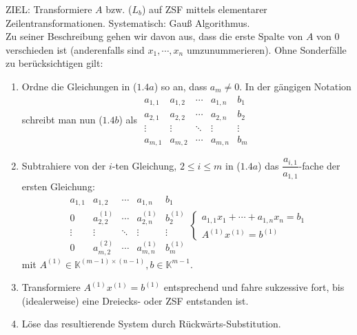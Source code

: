ZIEL: Transformiere $A$ bzw. (\hyperref[Lb]{$L_b$}) auf ZSF mittels elementarer Zeilentransformationen.  Systematisch: Gauß Algorithmus.\\
Zu seiner Beschreibung gehen wir davon aus, dass die erste Spalte von $A$ von $0$ verschieden ist (anderenfalls sind $x_1,\cdots ,x_n$ umzunummerieren).  Ohne Sonderfälle zu berücksichtigen gilt:
\begin{enumerate}
\item Ordne die Gleichungen in ($1.4a$) so an, dass $a_m\not= 0$.  In der gängigen Notation schreibt man nun (\hyperref[1.4b]{$1.4b$}) als $\begin{array}{cccc|c}a_{1,1} & a_{1,2} & \cdots & a_{1,n} & b_1\\a_{2,1} & a_{2,2} & \cdots & a_{2,n} & b_2\\\vdots & \vdots & \ddots &\vdots &\vdots \\a_{m,1} & a_{m,2} & \cdots & a_{m,n} & b_m\end{array}$
\item Subtrahiere von der $i$-ten Gleichung, $2\leq i\leq m$ in ($1.4a$) das $\dfrac{a_{i,1}}{a_{1,1}}$-fache der ersten Gleichung: 
\[\begin{array}{cccc|c}a_{1,1} & a_{1,2} & \cdots & a_{1,n} & b_1\\0 & a_{2,2}^{(1)} & \cdots & a_{2,n}^{(1)} & b_2^{(1)}\\ \vdots &\vdots &\ddots &\vdots &\vdots \\0 & a_{m,2}^{(2)} & \cdots & a_{m,n}^{(1)} & b_m^{(1)}\end{array} \begin{cases}a_{1,1}x_1+\cdots + a_{1,n}x_n=b_1 \\ A^{(1)}x^{(1)} = b^{(1)}\end{cases}\]
mit $A^{(1)}\in\mathbb{K}^{(m-1)\times (n-1)},b\in \mathbb{K}^{m-1}$.
\item Transformiere $A^{(1)}x^{(1)} = b^{(1)}$ entsprechend und fahre sukzessive fort, bis (idealerweise) eine Dreiecks- oder ZSF entstanden ist.
\item Löse das resultierende System durch Rückwärts-Substitution.
\end{enumerate}
